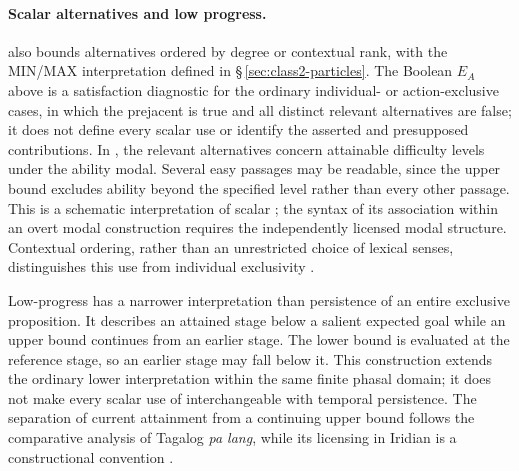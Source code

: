 \paragraph{Scalar alternatives and low progress.}
 also bounds alternatives ordered by degree or contextual rank,
with the MIN/MAX interpretation defined in §\,\ref{sec:class2-particles}.
The Boolean $E_A$ above is a satisfaction diagnostic for the ordinary
individual- or action-exclusive cases, in which the prejacent is true and
all distinct relevant alternatives are false; it does not define every
scalar use or identify the asserted and presupposed contributions. In
, the relevant alternatives
concern attainable difficulty levels under the ability modal. Several easy
passages may be readable, since the upper bound excludes ability beyond the
specified level rather than every other passage. This is a schematic
interpretation of scalar ; the syntax of its association within
an overt modal construction requires the independently licensed modal
structure. Contextual ordering, rather than an unrestricted choice of
lexical senses, distinguishes this use from individual exclusivity
\cite[§2.3]{coppockbeaver2014}.

Low-progress  has a narrower interpretation than persistence
of an entire exclusive proposition. It describes an attained stage below a
salient expected goal while an upper bound continues from an earlier stage.
The lower bound is evaluated at the reference stage, so an earlier stage may
fall below it. This construction extends the ordinary lower interpretation
within the same finite phasal domain; it does not make every scalar use of
 interchangeable with temporal persistence. The separation of
current attainment from a continuing upper bound follows the comparative
analysis of Tagalog \textit{pa lang}, while its licensing in Iridian is a
constructional convention \cite[§4]{hsieherlewine2023nthu}.

